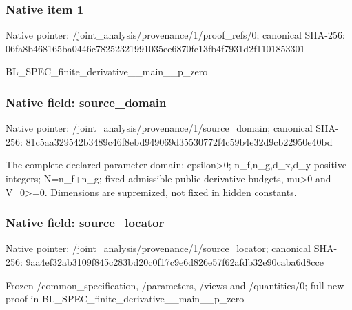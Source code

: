 \documentclass[10pt,a4paper]{article}
\begin{document}
\subsubsection{Native item 1}
Native pointer: /joint\_\allowbreak{}analysis/provenance/1/proof\_\allowbreak{}refs/0; canonical SHA-256: 06fa8b468165ba0446c78252321991035ee6870fe13fb4f7931d2f1101853301

\begingroup\raggedright\sloppy BL\_\allowbreak{}SPEC\_\allowbreak{}finite\_\allowbreak{}derivative\_\allowbreak{}\_\allowbreak{}main\_\allowbreak{}\_\allowbreak{}p\_\allowbreak{}zero\par\endgroup

\subsubsection{Native field: source\_\allowbreak{}domain}
Native pointer: /joint\_\allowbreak{}analysis/provenance/1/source\_\allowbreak{}domain; canonical SHA-256: 81c5aa329542b3489c46f8ebd949069d35530772f4c59b4e32d9cb22950e40bd

\begingroup\raggedright\sloppy The complete declared parameter domain:\allowbreak{} epsilon>0;\allowbreak{} n\_\allowbreak{}f,\allowbreak{}n\_\allowbreak{}g,\allowbreak{}d\_\allowbreak{}x,\allowbreak{}d\_\allowbreak{}y positive integers;\allowbreak{} N=\allowbreak{}n\_\allowbreak{}f+n\_\allowbreak{}g;\allowbreak{} fixed admissible public derivative budgets,\allowbreak{} mu>0 and V\_\allowbreak{}0>=\allowbreak{}0. Dimensions are supremized,\allowbreak{} not fixed in hidden constants.\par\endgroup

\subsubsection{Native field: source\_\allowbreak{}locator}
Native pointer: /joint\_\allowbreak{}analysis/provenance/1/source\_\allowbreak{}locator; canonical SHA-256: 9aa4ef32ab3109f845c283bd20c0f17c9e6d826e57f62afdb32e90caba6d8cce

\begingroup\raggedright\sloppy Frozen /\allowbreak{}common\_\allowbreak{}specification,\allowbreak{} /\allowbreak{}parameters,\allowbreak{} /\allowbreak{}views and /\allowbreak{}quantities/\allowbreak{}0;\allowbreak{} full new proof in BL\_\allowbreak{}SPEC\_\allowbreak{}finite\_\allowbreak{}derivative\_\allowbreak{}\_\allowbreak{}main\_\allowbreak{}\_\allowbreak{}p\_\allowbreak{}zero\par\endgroup
\end{document}

